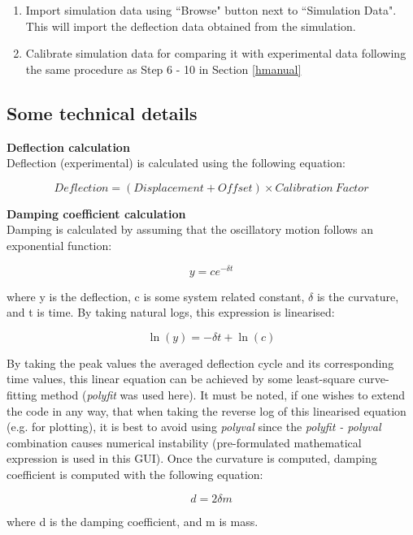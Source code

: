 \documentclass[12pt]{article}
\begin{document}
\begin{enumerate}
        \item   Import simulation data using ``Browse" button next to ``Simulation
    Data". This will import the deflection data obtained from the simulation. 

        \item   Calibrate simulation data for comparing it with experimental data
    following the same procedure as Step 6 - 10 in Section \ref{hmanual}

    \end{enumerate}

\subsection{Some technical details}

\textbf{Deflection calculation}\\

\noindent Deflection (experimental) is calculated using the following equation:

\[Deflection = (Displacement + Offset)\times Calibration~Factor \]


\noindent \textbf{Damping coefficient calculation}\\

\noindent Damping is calculated by assuming that the oscillatory motion follows an exponential function:

\[y = ce^{-\delta t} \]

\noindent where y is the deflection, c is some system related constant,
$\delta$ is the curvature, and t is time. By taking natural logs, this
expression is linearised:

\[\ln(y) = -\delta t + \ln (c)\]

\noindent By taking the peak values the averaged deflection cycle and its
corresponding time values, this linear equation can be achieved by some
least-square curve-fitting method (\textit{polyfit} was used here). It must be
noted, if one wishes to extend the code in any way, that when taking the
reverse log of this linearised equation (e.g. for plotting), it is best to
avoid using \textit{polyval} since the \textit{polyfit - polyval} combination
causes numerical instability (pre-formulated mathematical expression is used in
this GUI). Once the curvature is computed, damping coefficient is computed with
the following equation:

\[d = 2\delta m \]

\noindent where d is the damping coefficient, and m is mass.
\end{document}
